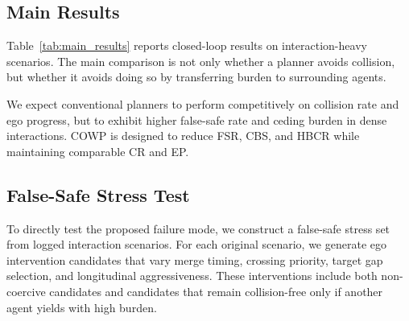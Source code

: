 \documentclass[10pt]{article}
\begin{document}
\subsection{Main Results}
\label{sec:main_results}

Table~\ref{tab:main_results} reports closed-loop results on interaction-heavy scenarios. The main comparison is not only whether a planner avoids collision, but whether it avoids doing so by transferring burden to surrounding agents.

\begin{table}[t]
\centering
\caption{Closed-loop planning performance on interaction-heavy scenarios. Lower is better for CR, FSR, CBS, and HBCR. Higher is better for EP and OPR.}
\label{tab:main_results}
\end{table}

We expect conventional planners to perform competitively on collision rate and ego progress, but to exhibit higher false-safe rate and ceding burden in dense interactions. COWP is designed to reduce FSR, CBS, and HBCR while maintaining comparable CR and EP.

\subsection{False-Safe Stress Test}
\label{sec:false_safe_stress}

To directly test the proposed failure mode, we construct a false-safe stress set from logged interaction scenarios. For each original scenario, we generate ego intervention candidates that vary merge timing, crossing priority, target gap selection, and longitudinal aggressiveness. These interventions include both non-coercive candidates and candidates that remain collision-free only if another agent yields with high burden.
\end{document}
